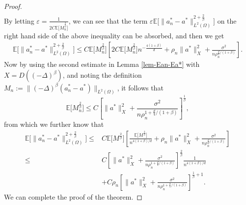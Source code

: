 \documentclass[10pt,a4paper]{amsart}
\begin{document}
\begin{proof}
\[\begin{aligned}
\end{aligned}
\]
By letting $\varepsilon=\frac1{2C\mathbb{E} \bigl[M_n^{\frac2\beta} \bigr]}$, we can see that the term  $\varepsilon\mathbb{E} \bigl[\|a_n^* - a^* \|^{2+\frac2\beta}_{L^2(\Omega)} \bigr]$ on the right hand side of the above inequality can be absorbed, and then we get
\[
\begin{aligned}
\mathbb{E} \bigl[ \| a_n^* - a^* \|^{2+\frac{2}{\beta}}_{L^2(\Omega)} \bigr]
\le  C\mathbb{E} \bigl[M_n^{\frac2\beta} \bigr] \left[ 2C\mathbb{E} \bigl[M_n^{\frac2\beta} \bigr] n^{-\frac{4(1+\beta)}d}  +  \rho_n \| a^* \|^2_{X} +  \frac{\sigma^2}{n \rho_n^{\frac{d}{4}/(1+\beta)}} \right].
\end{aligned}
\]
Now by using the second estimate in Lemma \ref{lem-Ean-Ea*} with $X=D((-\Delta)^\beta)$, and noting the definition $M_n:=\|(-\Delta)^\beta (a_n^* - a^*)\|_{L^2(\Omega)}$, it follows that
$$
\mathbb{E} \bigl[M_n^{\frac2\beta} \bigr] \le C\left[ \| a^* \|^2_{X} + \frac{\sigma^2}{n \rho_n^{1 + \frac{d}4/(1+\beta)}}\right]^{\frac1\beta},
$$
from which we further know that
\[
\begin{aligned}
\mathbb{E} \bigl[ \| a_n^* - a^* \|^{2+\frac{2}{\beta}}_{L^2(\Omega)} \bigr]
\le&  C\mathbb{E} \bigl[M^{\frac2\beta} \bigr] \left[ \frac{\mathbb{E} \bigl[M^{\frac2\beta} \bigr]}{n^{4(1+\beta)/d}}  +  \rho_n \| a^* \|^2_{X} +  \frac{\sigma^2}{n \rho_n^{\frac{d}{4}/(1+\beta)}} \right]\\
\le & C\left[ \| a^* \|^2_{X} + \frac{\sigma^2}{n \rho_n^{1 + \frac{d}4/(1+\beta)}}\right]^{\frac2\beta} \frac1{n^{4(1+\beta)/d}} \\
&+ C\rho_n\left[ \| a^* \|^2_{X} + \frac{\sigma^2}{n \rho_n^{1 + \frac{d}4/(1+\beta)}}\right]^{\frac1\beta+1}.
\end{aligned}
\]
We can complete the proof of the theorem.
\end{proof}
\end{document}
